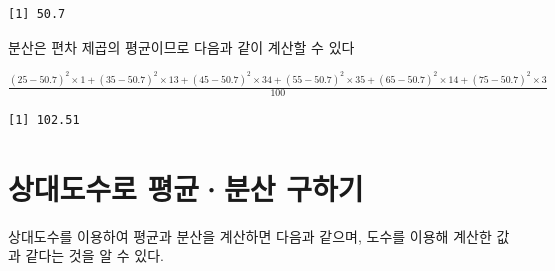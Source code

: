 \documentclass[
  letterpaper,
  DIV=11,
  numbers=noendperiod]{scrreprt}
\newenvironment{Shaded}{\begin{snugshade}}{\end{snugshade}}
\newcommand{\AttributeTok}[1]{\textcolor[rgb]{0.40,0.45,0.13}{#1}}
\newcommand{\DecValTok}[1]{\textcolor[rgb]{0.68,0.00,0.00}{#1}}
\newcommand{\FloatTok}[1]{\textcolor[rgb]{0.68,0.00,0.00}{#1}}
\newcommand{\FunctionTok}[1]{\textcolor[rgb]{0.28,0.35,0.67}{#1}}
\newcommand{\NormalTok}[1]{\textcolor[rgb]{0.00,0.23,0.31}{#1}}
\newcommand{\SpecialCharTok}[1]{\textcolor[rgb]{0.37,0.37,0.37}{#1}}
\newcommand{\StringTok}[1]{\textcolor[rgb]{0.13,0.47,0.30}{#1}}
\begin{document}
\begin{verbatim}
[1] 50.7
\end{verbatim}

분산은 편차 제곱의 평균이므로 다음과 같이 계산할 수 있다

\(\frac{(25-50.7)^2\times1+(35-50.7)^2\times13+(45-50.7)^2\times34+(55-50.7)^2\times35+(65-50.7)^2\times14+(75-50.7)^2\times3}{100}\)

\begin{Shaded}
\end{Shaded}

\begin{verbatim}
[1] 102.51
\end{verbatim}

\hypertarget{uxc0c1uxb300uxb3c4uxc218uxb85c-uxd3c9uxade0uxbd84uxc0b0-uxad6cuxd558uxae30}{%
\section{상대도수로 평균·분산
구하기}\label{uxc0c1uxb300uxb3c4uxc218uxb85c-uxd3c9uxade0uxbd84uxc0b0-uxad6cuxd558uxae30}}

상대도수를 이용하여 평균과 분산을 계산하면 다음과 같으며, 도수를 이용해
계산한 값과 같다는 것을 알 수 있다.

\begin{Shaded}
\end{Shaded}
\end{document}
